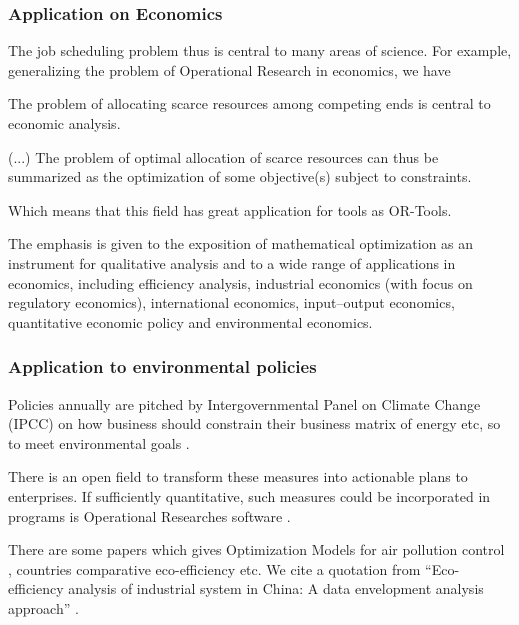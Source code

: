 \documentclass[
12pt,				%
openright,			%
oneside,			%
a4paper,			%
brazil,				%
english,			  %
]{abntex2}
\begin{document}
\subsubsection{Application on Economics}

The job scheduling problem thus is central to many areas of
science. For example, generalizing the problem of Operational
Research in economics, we have

\begin{citacao}
The problem of allocating scarce resources among competing ends is
central to economic analysis.

(...) The problem of optimal allocation of scarce resources can thus
be summarized as the optimization of some objective(s) subject to
constraints. \cite{luptacik2010mathematical}
\end{citacao}

Which means that this field has great application for tools as OR-Tools.

\begin{citacao}
The emphasis is given to the exposition of mathematical optimization as an
instrument for qualitative analysis and to a wide range of
applications in economics, including efficiency analysis, industrial
economics (with focus on regulatory economics), international
economics, input–output economics, quantitative economic policy and
environmental economics. \cite{luptacik2010mathematical}
\end{citacao}

\subsubsection{Application to environmental policies}
Policies annually are pitched by Intergovernmental Panel on Climate
Change (IPCC) on how business should constrain their business matrix
of energy etc, so to meet environmental goals
\cite{keysser20211}.

There is an open field to transform these
measures into actionable plans to enterprises. If sufficiently
quantitative, such measures could be incorporated in programs is
Operational Researches software \cite{luptacik2010mathematical}.

There are some papers which gives Optimization Models for
air pollution control \cite{abrams1975optimization}, countries comparative
eco-efficiency \cite{dyckhoff2001measuring} etc. We cite a quotation
from ``Eco-efficiency analysis of industrial system in China: A data
envelopment analysis approach'' \cite{zhang2008eco}.
\end{document}
